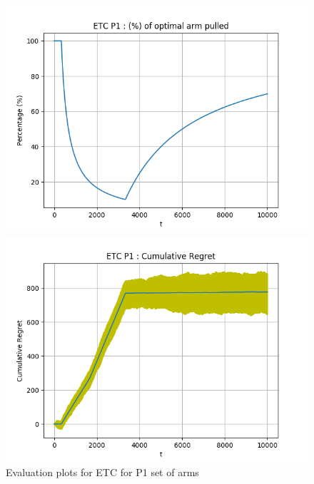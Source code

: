 \documentclass[12pt]{report}
\begin{document}
			\begin{figure}[H]
				\begin{multicols}{2}
					\includegraphics[scale=0.5]{Figures/ETC_P1_334_op.png} \par
					\includegraphics[scale=0.5]{Figures/ETC_P1_334_ret.png}
				\end{multicols}
				\caption{Evaluation plots for ETC for P1 set of arms}
				\label{Fig1}
			\end{figure}
				
\end{document}
